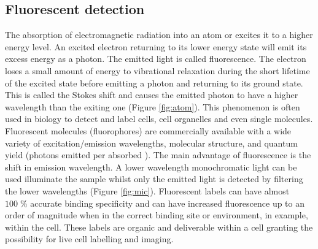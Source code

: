 \documentclass[final]{jyflluk}
\begin{document}
\subsection{Fluorescent detection}
\label{sec:x2}
The absorption of electromagnetic radiation into an atom or excites it to a higher energy level. An excited electron returning to its lower energy state will emit its excess energy as a photon. The emitted light is called fluorescence. The electron loses a small amount of energy to vibrational relaxation during the short lifetime of the excited state before emitting a photon and returning to its ground state. This is called the Stokes shift and causes the emitted photon to have a higher wavelength than the exiting one (Figure \ref{fig:atom}). This phenomenon is often used in biology to detect and label cells, cell organelles and even single molecules. Fluorescent molecules (fluorophores) are commercially available with a wide variety of excitation/emission wavelengths, molecular structure, and quantum yield (photons emitted per absorbed ). The main advantage of fluorescence is the shift in emission wavelength. A lower wavelength monochromatic light can be used illuminate the sample whilst only the emitted light is detected by filtering the lower wavelengths (Figure \ref{fig:mic}). Fluorescent labels can have almost $100 \; \percent$ accurate binding specificity and can have increased fluorescence up to an order of magnitude when in the correct binding site or environment, in example, within the cell. These labels are organic and deliverable within a cell granting the possibility for live cell labelling and imaging. \cite{toseland2013fluorescent}
 
\end{document}
